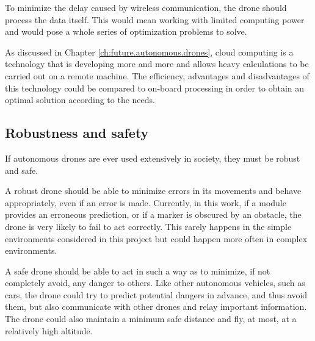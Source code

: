 To minimize the delay caused by wireless communication, the drone should process the data itself. This would mean working with limited computing power and would pose a whole series of optimization problems to solve.

As discussed in Chapter \ref{ch:future.autonomous.drones}, cloud computing is a technology that is developing more and more and allows heavy calculations to be carried out on a remote machine. The efficiency, advantages and disadvantages of this technology could be compared to on-board processing in order to obtain an optimal solution according to the needs.

\subsection{Robustness and safety}

If autonomous drones are ever used extensively in society, they must be robust and safe.

A robust drone should be able to minimize errors in its movements and behave appropriately, even if an error is made. Currently, in this work, if a module provides an erroneous prediction, or if a marker is obscured by an obstacle, the drone is very likely to fail to act correctly. This rarely happens in the simple environments considered in this project but could happen more often in complex environments.

A safe drone should be able to act in such a way as to minimize, if not completely avoid, any danger to others. Like other autonomous vehicles, such as cars, the drone could try to predict potential dangers in advance, and thus avoid them, but also communicate with other drones and relay important information. The drone could also maintain a minimum safe distance and fly, at most, at a relatively high altitude.
